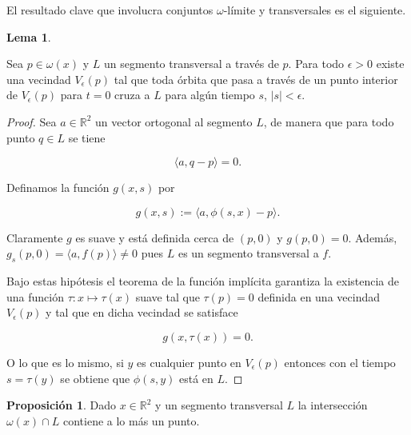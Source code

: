 \documentclass[11pt]{book}
\theoremstyle{definition}
\numberwithin{definition}{section}
\theoremstyle{theorem}
\newtheorem{lemma}{Lema}
\newtheorem{proposition}{Proposición}
\numberwithin{theorem}{section}
\numberwithin{lemma}{section}
\numberwithin{corollary}{section}
\theoremstyle{plain}
\numberwithin{example}{section}
\newcommand{\R}{{\ensuremath{\mathbb{R}}}}
\begin{document}
El resultado clave que involucra conjuntos $\omega$-límite y transversales es el siguiente.

\begin{lemma} \label{lem:transversalexistencias}

Sea $p \in \omega(x)$ y $L$ un segmento transversal a través de $p$. Para todo $\epsilon > 0$ existe una vecindad $V_\epsilon(p)$ tal que toda órbita que pasa a través de un punto interior de $V_\epsilon(p)$ para $t = 0$ cruza a $L$ para algún tiempo $s$, $|s| < \epsilon$. 
\end{lemma}
\begin{proof}
Sea $a \in \R^2$ un vector ortogonal al segmento $L$, de manera que para todo punto $q \in L$ se tiene

$$ \langle a, q-p \rangle = 0.$$

Definamos la función $g(x,s)$ por

$$ g(x,s) := \langle a, \phi(s, x) - p \rangle.$$

Claramente $g$ es suave y está definida cerca de $(p,0)$ y $g(p,0) = 0$. Además, $g_s(p,0) = \langle a, f(p) \rangle \neq 0$ pues $L$ es un segmento transversal a $f$.

Bajo estas hipótesis el teorema de la función implícita garantiza la existencia de una función $\tau: x \mapsto \tau(x)$ suave tal que $\tau(p) = 0$ definida en una vecindad $V_\epsilon(p)$ y tal que en dicha vecindad se satisface

$$ g(x, \tau(x)) = 0. $$

O lo que es lo mismo, si $y$ es cualquier punto en $V_\epsilon(p)$ entonces con el tiempo $s = \tau(y)$ se obtiene que $\phi(s, y)$ está en $L$.

\end{proof}

\begin{proposition}Dado $x \in \R^2$ y un segmento transversal $L$ la intersección $\omega(x) \cap L$ contiene a lo más un punto.
\end{proposition}
\end{document}
